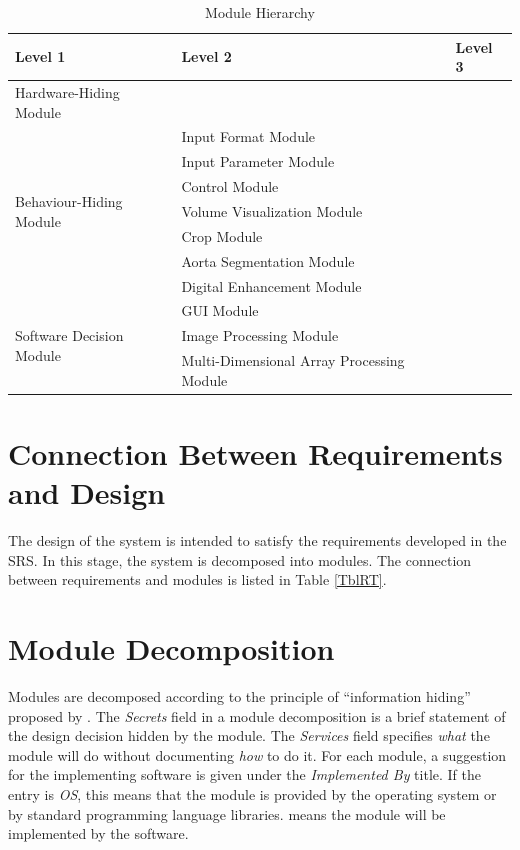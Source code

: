 \documentclass[12pt, titlepage]{article}
\begin{document}
\begin{table}[h!]
\centering
\begin{tabular}{p{} p{}p{}}
\toprule
\textbf{Level 1} & \textbf{Level 2} & \textbf{Level 3}\\
\midrule

{Hardware-Hiding Module} & ~ \\
\midrule

\multirow{7}{0.3\textwidth}{Behaviour-Hiding Module} 
&  Input Format Module & \\
&  Input Parameter Module & \\
& Control Module  & \\
& Volume Visualization Module  & \\
& Crop Module & \\
& Aorta Segmentation Module & \\
& Digital Enhancement Module & \\
\midrule

\multirow{3}{0.3\textwidth}{Software Decision Module}
& GUI Module & \\
& Image Processing Module \\
& Multi-Dimensional Array Processing Module\\
\bottomrule

\end{tabular}
\caption{Module Hierarchy}
\label{TblMH}
\end{table}

\section{Connection Between Requirements and Design} \label{SecConnection}

The design of the system is intended to satisfy the requirements developed in
the SRS. In this stage, the system is decomposed into modules. The connection
between requirements and modules is listed in Table \ref{TblRT}.

\section{Module Decomposition} \label{SecMD}

Modules are decomposed according to the principle of ``information hiding''
proposed by \citet{ParnasEtAl1984}. The \emph{Secrets} field in a module
decomposition is a brief statement of the design decision hidden by the
module. The \emph{Services} field specifies \emph{what} the module will do
without documenting \emph{how} to do it. For each module, a suggestion for the
implementing software is given under the \emph{Implemented By} title. If the
entry is \emph{OS}, this means that the module is provided by the operating
system or by standard programming language libraries.  \emph{\progname{}} means the
module will be implemented by the \progname{} software.
\end{document}
